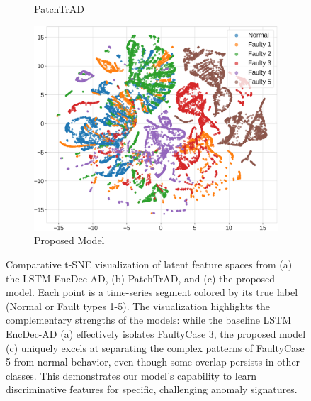 \documentclass{article}
\begin{document}
\begin{figure}[t]
\begin{subfigure}[b]{0.32\textwidth}
        \caption{PatchTrAD}\label{fig:tsne_patchtrad}
    \end{subfigure}
    \hfill
    \begin{subfigure}[b]{0.32\textwidth}
        \centering
        \includegraphics[width=\textwidth]{figures/tsne_patch_visualization.png}
        \caption{Proposed Model}\label{fig:tsne_proposed}
    \end{subfigure}
    \caption{Comparative t-SNE visualization of latent feature spaces from (a) the LSTM EncDec-AD, (b) PatchTrAD, and (c) the proposed model. Each point is a time-series segment colored by its true label (Normal or Fault types 1-5). The visualization highlights the complementary strengths of the models: while the baseline LSTM EncDec-AD (a) effectively isolates FaultyCase 3, the proposed model (c) uniquely excels at separating the complex patterns of FaultyCase 5 from normal behavior, even though some overlap persists in other classes. This demonstrates our model's capability to learn discriminative features for specific, challenging anomaly signatures.}\label{fig:tsne_comparison}
\end{figure}
\end{document}
